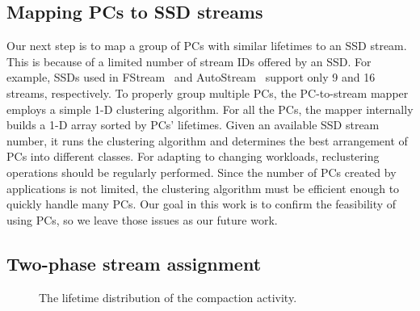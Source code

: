\subsection{Mapping PCs to SSD streams}
Our next step is to map a group of PCs with similar lifetimes to an SSD stream.
This is because of a limited number of stream IDs offered by an SSD. For
example, SSDs used in FStream~\cite{FStream} and AutoStream~\cite{AutoStream}
support only 9 and 16 streams, respectively. To properly group multiple PCs,
the PC-to-stream mapper employs a simple 1-D clustering algorithm.  For all the
PCs, the mapper internally builds a 1-D array sorted by PCs' lifetimes.  Given
an available SSD stream number, it runs the clustering algorithm and determines
the best arrangement of PCs into different classes.  For adapting to changing
workloads, reclustering operations should be regularly performed. Since the
number of PCs created by applications is not limited, the clustering algorithm
must be efficient enough to quickly handle many PCs. Our goal in this work is
to confirm the feasibility of using PCs, so we leave
those issues as our future work.

\vspace{-5pt}
\subsection{Two-phase stream assignment}
\begin{figure}[!t]
\centering
\hspace{2pt}
\hfill
\vspace{-10pt}
\vspace{-10pt}
\caption{The lifetime distribution of the compaction activity.} 
\label{fig:compaction}
\vspace{-15pt}
\end{figure}

